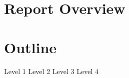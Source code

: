 
\author{}

\maketitle
\section{Report Overview}
\section{Outline}
\begin{outline}[enumerate]
\1 Level 1
\2 Level 2
\3 Level 3
\4 Level 4
\end{outline}

